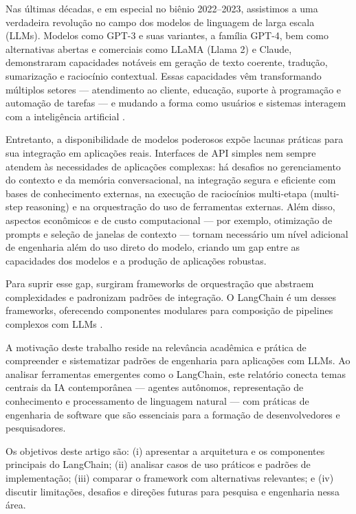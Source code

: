 \documentclass[12pt]{article}
\begin{document}
Nas últimas décadas, e em especial no biênio 2022–2023, assistimos a uma verdadeira revolução no campo dos modelos de linguagem de larga escala (LLMs). Modelos como GPT-3 e suas variantes, a família GPT-4, bem como alternativas abertas e comerciais como LLaMA (Llama 2) e Claude, demonstraram capacidades notáveis em geração de texto coerente, tradução, sumarização e raciocínio contextual. Essas capacidades vêm transformando múltiplos setores — atendimento ao cliente, educação, suporte à programação e automação de tarefas — e mudando a forma como usuários e sistemas interagem com a inteligência artificial \cite{brown2020language, openai2023gpt4, touvron2023llama, anthropic2023claude}.

Entretanto, a disponibilidade de modelos poderosos expõe lacunas práticas para sua integração em aplicações reais. Interfaces de API simples nem sempre atendem às necessidades de aplicações complexas: há desafios no gerenciamento do contexto e da memória conversacional, na integração segura e eficiente com bases de conhecimento externas, na execução de raciocínios multi-etapa (multi-step reasoning) e na orquestração do uso de ferramentas externas. Além disso, aspectos econômicos e de custo computacional — por exemplo, otimização de prompts e seleção de janelas de contexto — tornam necessário um nível adicional de engenharia além do uso direto do modelo, criando um gap entre as capacidades dos modelos e a produção de aplicações robustas.

Para suprir esse gap, surgiram frameworks de orquestração que abstraem complexidades e padronizam padrões de integração. O LangChain é um desses frameworks, oferecendo componentes modulares para composição de pipelines complexos com LLMs \cite{langchain2023docs, langchain2023github}.

A motivação deste trabalho reside na relevância acadêmica e prática de compreender e sistematizar padrões de engenharia para aplicações com LLMs. Ao analisar ferramentas emergentes como o LangChain, este relatório conecta temas centrais da IA contemporânea — agentes autônomos, representação de conhecimento e processamento de linguagem natural — com práticas de engenharia de software que são essenciais para a formação de desenvolvedores e pesquisadores.

Os objetivos deste artigo são: (i) apresentar a arquitetura e os componentes principais do LangChain; (ii) analisar casos de uso práticos e padrões de implementação; (iii) comparar o framework com alternativas relevantes; e (iv) discutir limitações, desafios e direções futuras para pesquisa e engenharia nessa área.
\end{document}

